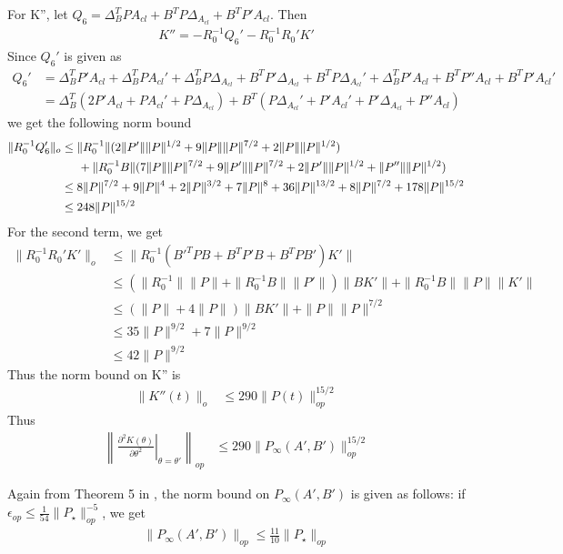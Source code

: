 For K'', let $Q_6 = \Delta_B^TPA_{cl} + B^TP\Delta_{A_{cl}} + B^TP'A_{cl}$. Then 
\begin{align*}
    K'' = -R_0^{-1}Q_6' - R_0^{-1}R_0'K'
\end{align*}
Since $Q_6'$ is given as
\begin{align*}
    Q_6' &= \Delta_B^TP'A_{cl} + \Delta_B^TPA_{cl}' + \Delta_B^TP\Delta_{A_{cl}} + B^TP'\Delta_{A_{cl}} +B^TP\Delta_{A_{cl}}' + \Delta_B^TP'A_{cl} + B^TP''A_{cl} + B^TP'A_{cl}' \\
    &=\Delta_B^T(2P'A_{cl} + PA_{cl}' + P\Delta_{A_{cl}}) + B^T(P\Delta_{A_{cl}}' + P'A_{cl}' + P'\Delta_{A_{cl}} + P''A_{cl})
\end{align*}
we get the following norm bound 
\begin{align*}
    \|R_0^{-1}Q_6'\|_o &\leq \|R_0^{-1}\|(2\|P'\|\|P\|^{1/2} + 9\|P\|\|P\|^{7/2} + 2\|P\|\|P\|^{1/2}) \\
    &\hspace{5mm} + \|R_0^{-1}B\|(7\|P\|\|P\|^{7/2}+ 9\|P'\|\|P\|^{7/2} + 2\|P'\|\|P\|^{1/2} + \|P''\|\|P\|^{1/2}) \\
    &\leq 8\|P\|^{7/2} + 9\|P\|^4 + 2\|P\|^{3/2} + 7\|P\|^8 + 36\|P\|^{13/2} + 8\|P\|^{7/2} + 178\|P\|^{15/2} \\
    &\leq 248\|P\|^{15/2}
\end{align*}
For the second term, we get
\begin{align*}
    \|R_0^{-1}R_0'K'\|_o &\leq \|R_0^{-1}(B'^TPB + B^TP'B + B^TPB')K'\| \\
    &\leq (\|R_0^{-1}\|\|P\| + \|R_0^{-1}B\|\|P'\|)\|BK'\| + \|R_0^{-1}B\|\|P\|\|K'\| \\
    &\leq (\|P\| + 4\|P\|)\|BK'\| + \|P\|\|P\|^{7/2}\\
    &\leq 35\|P\|^{9/2} + 7\|P\|^{9/2} \\
    &\leq 42\|P\|^{9/2}
\end{align*}
Thus the norm bound on K'' is
\begin{align*}
    \|K''(t)\|_o &\leq 290\|P(t)\|^{15/2}_{op}
\end{align*}
Thus
\begin{align}
    \left\|\left.\frac{\partial^2 K(\theta)}{\partial\theta^2}\right|_{\theta=\theta'}\right\|_{op}
    &\leq 290\|P_{\infty}(A', B')\|^{15/2}_{op}\label{eq:d2k/dtheta2 bound}
\end{align}

Again from Theorem 5 in \citep{simchowitz2020naive}, the norm bound on $P_{\infty}(A', B')$ is given as follows: if $\epsilon_{op}\leq\frac{1}{54}\|P_\star\|_{op}^{-5}$, we get
\begin{align}
    \|P_{\infty}(A', B')\|_{op} \leq \frac{11}{10}\|P_\star\|_{op} \label{eq:P(A',B') bound}
\end{align}